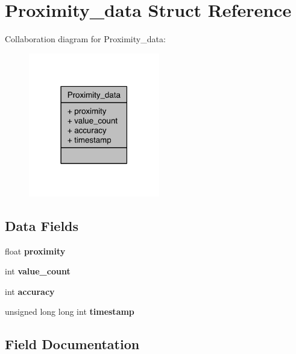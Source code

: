 \section{Proximity\-\_\-data Struct Reference}
\label{structProximity__data}


Collaboration diagram for Proximity\-\_\-data\-:\nopagebreak
\begin{figure}[H]
\begin{center}
\leavevmode
\includegraphics[width=162pt]{structProximity__data__coll__graph}
\end{center}
\end{figure}
\subsection*{Data Fields}
\begin{DoxyCompactItemize}
\item 
float {\bfseries proximity}\label{structProximity__data_a887e949cf8d3ba5851dc0982b12b28d6}

\item 
int {\bfseries value\-\_\-count}\label{structProximity__data_ad4be86635ea4960c502c58c0431de92b}

\item 
int {\bfseries accuracy}\label{structProximity__data_a0f0dfb5e5b6095d725f44e5cdd1bc389}

\item 
unsigned long long int {\bfseries timestamp}\label{structProximity__data_afc13156ab5ec4e49defdd853f80b3e7e}

\end{DoxyCompactItemize}


\subsection{Field Documentation}
